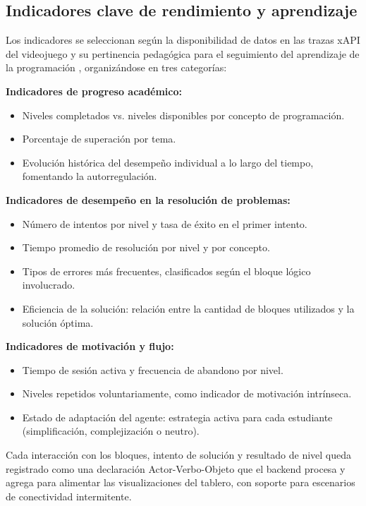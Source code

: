 \subsection{Indicadores clave de rendimiento y aprendizaje}

Los indicadores se seleccionan según la disponibilidad de datos en las trazas
xAPI del videojuego y su pertinencia pedagógica para el seguimiento del
aprendizaje de la programación \cite{serrano2017xapi}, organizándose en tres
categorías:

\textbf{Indicadores de progreso académico:}
\begin{itemize}[itemsep=2pt, parsep=0pt]
	\item Niveles completados vs. niveles disponibles por concepto de programación.
	\item Porcentaje de superación por tema.
	\item Evolución histórica del desempeño individual a lo largo del tiempo,
	fomentando la autorregulación.
\end{itemize}

\textbf{Indicadores de desempeño en la resolución de problemas:}
\begin{itemize}[itemsep=2pt, parsep=0pt]
	\item Número de intentos por nivel y tasa de éxito en el primer intento.
	\item Tiempo promedio de resolución por nivel y por concepto.
	\item Tipos de errores más frecuentes, clasificados según el bloque lógico
	involucrado.
	\item Eficiencia de la solución: relación entre la cantidad de bloques utilizados
	y la solución óptima.
\end{itemize}

\textbf{Indicadores de motivación y flujo:}
\begin{itemize}[itemsep=2pt, parsep=0pt]
	\item Tiempo de sesión activa y frecuencia de abandono por nivel.
	\item Niveles repetidos voluntariamente, como indicador de motivación intrínseca.
	\item Estado de adaptación del agente: estrategia activa para cada estudiante
	(simplificación, complejización o neutro).
\end{itemize}

Cada interacción con los bloques, intento de solución y resultado de nivel
queda registrado como una declaración Actor-Verbo-Objeto que el backend
procesa y agrega para alimentar las visualizaciones del tablero, con soporte
para escenarios de conectividad intermitente.

